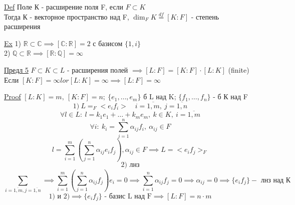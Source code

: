 \documentclass[a4paper]{article}
\begin{document}
\underline{Def} Поле К - расширение поля F, если $ F \subset K $ \\
Тогда К - векторное пространство над F, $ \dim_F K \stackrel{df}{=} [K:F] $ -
степень расширения

\underline{Ex} 1) $ \mathbb{R} \subset \mathbb{C} \implies [\mathbb{C}:\mathbb{R}]
= 2$ с базисом $ \{ 1,i \} $ \\
2) $ \mathbb{Q} \subset \mathbb{R} \implies [\mathbb{R}:\mathbb{Q}] = \infty $ 

\underline{Предл 5} $ F \subset K \subset L $ - расширения полей $ \implies
[L:F] = [K:F] \cdot [L:K]$ (finite)\\
Если $ [K:F] = \infty lor [L:K] = \infty \implies [L:F] = \infty $ 

\underline{Proof} $ [L:K] = m, \ [K:F] = n; \ \{ e_1,\dots , e_m \} $ б L над K;
$ \{ f_1, \dots, f_n \} $ - б К над F
\[
    1) \ L = _F<e_if_i> \quad i = \overline{1,m}, \ j = \overline{1,n}
\]
\[
    \forall l \in L: \ l = k_1 e_1 + \dots + k_m e_m, \ k \in K, \ i = \overline{1,m}
\]
\[
    \forall i: \ k_i = \sum_{j=1}^{n} \alpha_{ij}f_i, \ \alpha_{ij} \in F
\]
\[
    l = \sum_{i=1}^{m} \left( \sum_{j=1}^{n} \alpha_{ij} e_i f_j \right), 
    \alpha_{ij} \in F \implies L = <e_if_j>_F
\]
\[
    2) \text{ лнз}
\]
\[
    \sum_{i=\overline{1,m}, j=\overline{1,n}}  \implies \sum_{i=1}^{m} \left(
    \sum_{j=1}^{n} \alpha_{ij}f_j \right) e_i = 0 \implies 
    \sum_{i=1}^{n} \alpha_{ij} f_j = 0 \implies \alpha_{ij} = 0 \implies
    \{ e_i f_j \} - \text{ лнз над К}
\]
\[
    1) \text{ и } 2) \implies \{ e_i f_j \} \text{ - базис L над F} \implies
    [L:F] = n \cdot m
\]
\end{document}
